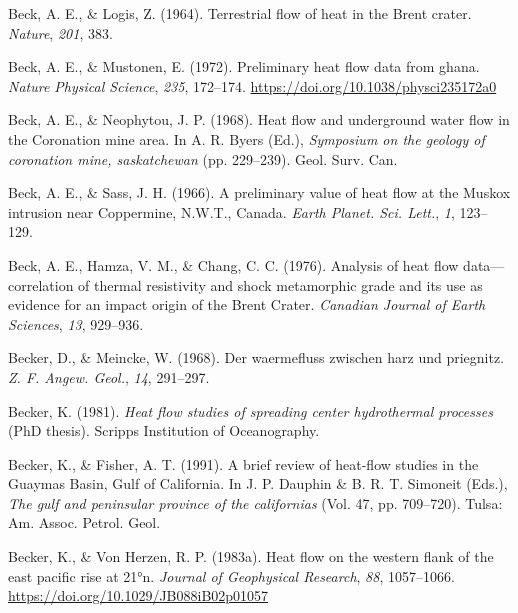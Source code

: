 \documentclass[draft,linenumbers]{agujournal2018}
\begin{document}
\leavevmode{}%
Beck, A. E., \& Logis, Z. (1964). Terrestrial flow of heat in the
{Brent} crater. \emph{Nature}, \emph{201}, 383.

\leavevmode{}%
Beck, A. E., \& Mustonen, E. (1972). Preliminary heat flow data from
ghana. \emph{Nature Physical Science}, \emph{235}, 172--174.
\url{https://doi.org/10.1038/physci235172a0}

\leavevmode{}%
Beck, A. E., \& Neophytou, J. P. (1968). Heat flow and underground water
flow in the {Coronation} mine area. In A. R. Byers (Ed.),
\emph{Symposium on the geology of coronation mine, saskatchewan} (pp.
229--239). Geol. Surv. Can.

\leavevmode{}%
Beck, A. E., \& Sass, J. H. (1966). A preliminary value of heat flow at
the {Muskox} intrusion near {Coppermine, N.W.T., Canada}. \emph{Earth
Planet. Sci. Lett.}, \emph{1}, 123--129.

\leavevmode{}%
Beck, A. E., Hamza, V. M., \& Chang, C. C. (1976). Analysis of heat flow
data---correlation of thermal resistivity and shock metamorphic grade
and its use as evidence for an impact origin of the {Brent Crater}.
\emph{Canadian Journal of Earth Sciences}, \emph{13}, 929--936.

\leavevmode{}%
Becker, D., \& Meincke, W. (1968). Der waermefluss zwischen harz und
priegnitz. \emph{Z. F. Angew. Geol.}, \emph{14}, 291--297.

\leavevmode{}%
Becker, K. (1981). \emph{Heat flow studies of spreading center
hydrothermal processes} (PhD thesis). Scripps Institution of
Oceanography.

\leavevmode{}%
Becker, K., \& Fisher, A. T. (1991). A brief review of heat-flow studies
in the {Guaymas Basin, Gulf of California}. In J. P. Dauphin \& B. R. T.
Simoneit (Eds.), \emph{The gulf and peninsular province of the
californias} (Vol. 47, pp. 709--720). Tulsa: Am. Assoc. Petrol. Geol.

\leavevmode{}%
Becker, K., \& Von Herzen, R. P. (1983a). Heat flow on the western flank
of the east pacific rise at 21°n. \emph{Journal of Geophysical
Research}, \emph{88}, 1057--1066.
\url{https://doi.org/10.1029/JB088iB02p01057}
\end{document}
